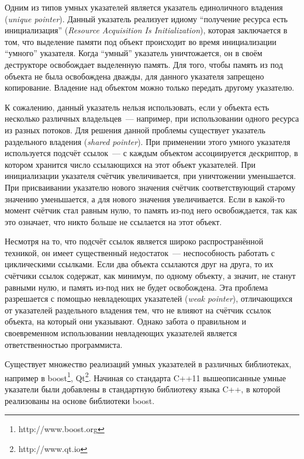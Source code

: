 Одним из типов умных указателей является указатель единоличного владения (\textit{unique pointer}). Данный указатель реализует идиому ``получение ресурса есть инициализация'' (\textit{Resource Acquisition Is Initialization}), которая заключается в том, что выделение памяти под объект происходит во время инициализации ``умного'' указателя. Когда ``умный'' указатель уничтожается, он в своём деструкторе освобождает выделенную память. Для того, чтобы память из под объекта не была освобождена дважды, для данного указателя запрещено копирование. Владение над объектом можно только передать другому указателю.

К сожалению, данный указатель нельзя использовать, если у объекта есть несколько различных владельцев~--- например, при использовании одного ресурса из разных потоков. Для решения данной проблемы существует указатель раздельного владения (\textit{shared pointer}). 
При применении этого умного указателя используется подсчёт ссылок~--- с каждым объектом ассоциируется дескриптор, в котором хранится число ссылающихся на этот объект указателей. При инициализации указателя счётчик увеличивается, при уничтожении уменьшается. При присваивании указателю нового значения счётчик соответствующий старому значению уменьшается, а для нового значения увеличивается. Если в какой-то момент счётчик стал равным нулю, то память из-под него освобождается, так как это означает, что никто больше не ссылается на этот объект.

Несмотря на то, что подсчёт ссылок является широко распространённой техникой, он имеет существенный недостаток~--- неспособность работать с циклическими ссылками. Если два объекта ссылаются друг на друга, то их счётчики ссылок содержат, как минимум, по одному объекту, а значит, не станут равными нулю, и память из-под них не будет освобождена. Эта проблема разрешается с помощью невладеющих указателей (\textit{weak pointer}), отличающихся от указателей раздельного владения тем, что не влияют на счётчик ссылок объекта, на который  они указывают. Однако забота о правильном и своевременном использовании невладеющих указателей является ответственностью программиста.

Существует множество реализаций умных указателей в различных библиотеках, например в boost\footnote{http://www.boost.org}, Qt\footnote{http://www.qt.io}. Начиная со стандарта C++11 вышеописанные умные указатели были добавлены в стандартную библиотеку языка C++, в которой реализованы на основе библиотеки boost.

